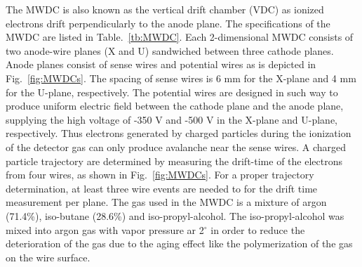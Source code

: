 The MWDC is also known as the vertical drift chamber (VDC) as  ionized electrons drift perpendicularly to the anode plane. The specifications of the MWDC are listed in Table.~\ref{tb:MWDC}. Each 2-dimensional MWDC consists of two anode-wire planes (X and U) sandwiched between three cathode planes. Anode planes consist of sense wires and potential wires as is depicted in  Fig.~\ref{fig:MWDCs}. The spacing of sense wires is 6 mm for the X-plane and 4 mm for the U-plane, respectively. The potential wires are designed in such way to produce uniform electric field between the cathode plane and the anode plane, supplying the high voltage of -350 V and -500 V in the X-plane and U-plane, respectively. Thus electrons generated by charged particles during the ionization of the detector gas can only produce avalanche near the sense wires. A charged particle trajectory are determined by  measuring the drift-time  of the electrons from four wires, as shown in Fig.~\ref{fig:MWDCs}. For a proper trajectory determination, at least three wire events are  needed to for the drift time measurement per plane. The gas used in the MWDC is a mixture of argon (71.4\%), iso-butane (28.6\%) and iso-propyl-alcohol. The iso-propyl-alcohol was mixed into argon gas with vapor pressure ar 2$^{\circ}$ in order to reduce the deterioration of the gas due to  the aging effect like the polymerization of the gas on the wire surface\citep{Adachi_thesis}\citep{yosoi_thesis}.


